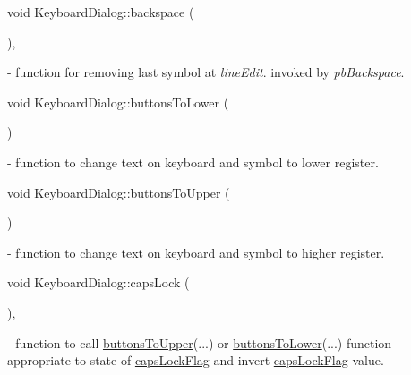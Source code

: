 \mbox{\label{classKeyboardDialog_a471f014a3c1a8ba612fce0ef2bc135a4}} 
{\footnotesize\ttfamily void Keyboard\+Dialog\+::\texorpdfstring{backspace}{backspace} (\begin{DoxyParamCaption}{ }\end{DoxyParamCaption}){\ttfamily [private]}, {\ttfamily [slot]}} - function for removing last symbol at \textit{line\+Edit}. invoked by \textit{pb\+Backspace}.

\mbox{\label{classKeyboardDialog_af8f1934505c0f78ad6b2a1e6aeb4cb2e}} 
{\footnotesize\ttfamily void Keyboard\+Dialog\+::\texorpdfstring{buttons\+To\+Lower}{buttonsToLower} (\begin{DoxyParamCaption}{ }\end{DoxyParamCaption})} - function to change text on keyboard and symbol to lower register.

\mbox{\label{classKeyboardDialog_a7a276672e902fa810e3c06047992fd69}} 
{\footnotesize\ttfamily void Keyboard\+Dialog\+::\texorpdfstring{buttons\+To\+Upper}{buttonsToUpper} (\begin{DoxyParamCaption}{ }\end{DoxyParamCaption})} - function to change text on keyboard and symbol to higher register.

\mbox{\label{classKeyboardDialog_a0baaa948c0434c2f1fe6056319fcc4e2}} 
{\footnotesize\ttfamily void Keyboard\+Dialog\+::\texorpdfstring{caps\+Lock}{capsLock} (\begin{DoxyParamCaption}{ }\end{DoxyParamCaption}){\ttfamily [private]}, {\ttfamily [slot]}} - function to call \hyperlink{classKeyboardDialog_a7a276672e902fa810e3c06047992fd69}{buttons\+To\+Upper}(...) or \hyperlink{classKeyboardDialog_af8f1934505c0f78ad6b2a1e6aeb4cb2e}{buttons\+To\+Lower}(...) function appropriate to state of \hyperlink{classKeyboardDialog_ac42a101f1ede0b3565cbc7d87bff20b4}{caps\+Lock\+Flag} and invert \hyperlink{classKeyboardDialog_ac42a101f1ede0b3565cbc7d87bff20b4}{caps\+Lock\+Flag} value.

